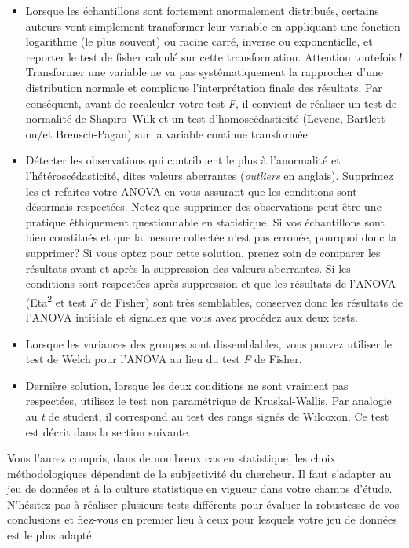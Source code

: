 \documentclass[
  11pt,
  french,
]{book}
\begin{document}
\begin{itemize}
\item
  Lorsque les échantillons sont fortement anormalement distribués, certains auteurs vont simplement transformer leur variable en appliquant une fonction logarithme (le plus souvent) ou racine carré, inverse ou exponentielle, et reporter le test de fisher calculé sur cette transformation. Attention toutefois ! Transformer une variable ne va pas systématiquement la rapprocher d'une distribution normale et complique l'interprétation finale des résultats. Par conséquent, avant de recalculer votre test \emph{F}, il convient de réaliser un test de normalité de Shapiro--Wilk et un test d'homoscédasticité (Levene, Bartlett ou/et Breusch-Pagan) sur la variable continue transformée.
\item
  Détecter les observations qui contribuent le plus à l'anormalité et l'hétéroscédasticité, dites valeurs aberrantes (\emph{outliers} en anglais). Supprimez les et refaites votre ANOVA en vous assurant que les conditions sont désormais respectées. Notez que supprimer des observations peut être une pratique éthiquement questionnable en statistique. Si vos échantillons sont bien constitués et que la mesure collectée n'est pas erronée, pourquoi donc la supprimer? Si vous optez pour cette solution, prenez soin de comparer les résultats avant et après la suppression des valeurs aberrantes. Si les conditions sont respectées après suppression et que les résultats de l'ANOVA (Eta\textsuperscript{2} et test \emph{F} de Fisher) sont très semblables, conservez donc les résultats de l'ANOVA intitiale et signalez que vous avez procédez aux deux tests.
\item
  Lorsque les variances des groupes sont dissemblables, vous pouvez utiliser le test de Welch pour l'ANOVA au lieu du test \emph{F} de Fisher.
\item
  Dernière solution, lorsque les deux conditions ne sont vraiment pas respectées, utilisez le test non paramétrique de Kruskal-Wallis. Par analogie au \emph{t} de student, il correspond au test des rangs signés de Wilcoxon. Ce test est décrit dans la section suivante.
\end{itemize}

Vous l'aurez compris, dans de nombreux cas en statistique, les choix méthodologiques dépendent de la subjectivité du chercheur. Il faut s'adapter au jeu de données et à la culture statistique en vigueur dans votre champs d'étude. N'hésitez pas à réaliser plusieurs tests différents pour évaluer la robustesse de vos conclusions et fiez-vous en premier lieu à ceux pour lesquels votre jeu de données est le plus adapté.
\end{document}
